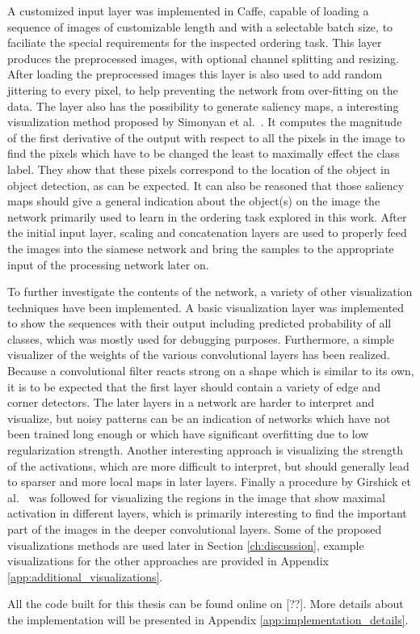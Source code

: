 A customized input layer was implemented in Caffe, capable of loading a sequence of images of customizable length and with a selectable batch size, to faciliate the special requirements for the inspected ordering task. This layer produces the preprocessed images, with optional channel splitting and resizing. After loading the preprocessed images this layer is also used to add random jittering to every pixel, to help preventing the network from over-fitting on the data. The layer also has the possibility to generate saliency maps, a interesting visualization method proposed by Simonyan et al.~\cite{simonyan2013}. It computes the magnitude of the first derivative of the output with respect to all the pixels in the image to find the pixels which have to be changed the least to maximally effect the class label. They show that these pixels correspond to the location of the object in object detection, as can be expected. It can also be reasoned that those saliency maps should give a general indication about the object(s) on the image the network primarily used to learn in the ordering task explored in this work. After the initial input layer, scaling and concatenation layers are used to properly feed the images into the siamese network and bring the samples to the appropriate input of the processing network later on.

To further investigate the contents of the network, a variety of other visualization techniques have been implemented. A basic visualization layer was implemented to show the sequences with their output including predicted probability of all classes, which was mostly used for debugging purposes. Furthermore, a simple visualizer of the weights of the various convolutional layers has been realized. Because a convolutional filter reacts strong on a shape which is similar to its own, it is to be expected that the first layer should contain a variety of edge and corner detectors. The later layers in a network are harder to interpret and visualize, but noisy patterns can be an indication of networks which have not been trained long enough or which have significant overfitting due to low regularization strength. Another interesting approach is visualizing the strength of the activations, which are more difficult to interpret, but should generally lead to sparser and more local maps in later layers. Finally a procedure by Girshick et al.~\cite{girshick2014} was followed for visualizing the regions in the image that show maximal activation in different layers, which is primarily interesting to find the important part of the images in the deeper convolutional layers. Some of the proposed visualizations methods are used later in Section \ref{ch:discussion}, example visualizations for the other approaches are provided in Appendix \ref{app:additional_visualizations}.

All the code built for this thesis can be found online on [??].  More details about the implementation will be presented in Appendix \ref{app:implementation_details}.
